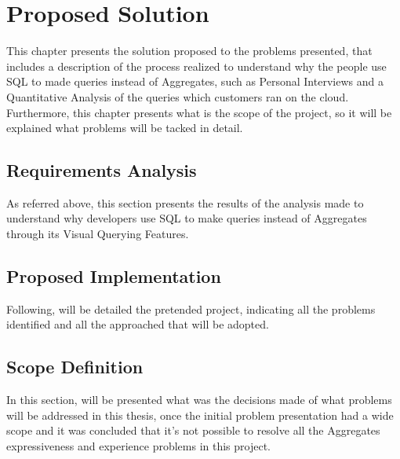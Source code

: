\chapter{Proposed Solution}
\label{cha:proposed_solution}
This chapter presents the solution proposed to the problems presented, that 
includes a description of the process realized to understand why the people 
use SQL to made queries instead of Aggregates, such as Personal Interviews and 
a Quantitative Analysis of the queries which customers ran on the cloud. 
Furthermore, this chapter presents what is the scope of the project, so it will 
be explained what problems will be tacked in detail.

\section{Requirements Analysis}
\label{sec:requirements_analysis}
As referred above, this section presents the results of the analysis made to 
understand why developers use SQL to make queries instead of Aggregates through 
its Visual Querying Features.

\section{Proposed Implementation}
\label{sec:proposed_implementation}
Following, will be detailed the pretended project, indicating all the problems 
identified and all the approached that will be adopted.

\section{Scope Definition}
\label{sec:scope_definition}
In this section, will be presented what was the decisions made of what problems 
will be addressed in this thesis, once the initial problem presentation had a wide 
scope and it was concluded that it's not possible to resolve all the Aggregates 
expressiveness and experience problems in this project.
